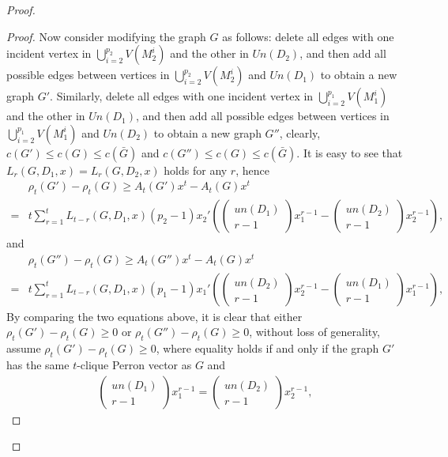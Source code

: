 \documentclass[preprint,12pt]{elsarticle}
\begin{document}
\begin{proof}
\begin{proof}
                Now consider modifying the graph $G$ as follows: delete all edges with one incident vertex in $\bigcup_{i=2}^{p_2} V(M_2^i)$ and the other in $Un(D_2)$, and then add all possible edges between vertices in $\bigcup_{i=2}^{p_2} V(M_2^i)$ and $Un(D_1)$ to obtain a new graph $G'$. Similarly, delete all edges with one incident vertex in $\bigcup_{i=2}^{p_1} V(M_1^i)$ and the other in $Un(D_1)$, and then add all possible edges between vertices in $\bigcup_{i=2}^{p_1} V(M_1^i)$ and $Un(D_2)$ to obtain a new graph $G''$, clearly, $c(G') \leq c(G) \leq c(\bar{G})$ and $c(G'') \leq c(G) \leq c(\bar{G})$. It is easy to see that $L_r(G, D_1, x) = L_r(G, D_2, x)$ holds for any $r$, hence
                    \begin{align*}
                        &\rho_t(G')-\rho_t(G)
                        \geq  A_t(G')x^t-A_t(G)x^t
                        \\= & t\sum_{r=1}^{t}L_{t-r}(G, D_1, x) (p_2-1)x_2' \left( \begin{pmatrix}un(D_1)\\r-1\end{pmatrix}x_1^{r-1}-\begin{pmatrix}un(D_2)\\r-1\end{pmatrix}x_2^{r-1} \right),
                    \end{align*}
                and
                    \begin{align*}
                        &\rho_t(G'')-\rho_t(G)
                        \geq  A_t(G'')x^t-A_t(G)x^t
                        \\= & t\sum_{r=1}^{t}L_{t-r}(G, D_1, x) (p_1-1)x_1' \left( \begin{pmatrix}un(D_2)\\r-1\end{pmatrix}x_2^{r-1}-\begin{pmatrix}un(D_1)\\r-1\end{pmatrix}x_1^{r-1} \right),
                    \end{align*}
                By comparing the two equations above, it is clear that either $\rho_t(G')-\rho_t(G)\geq 0$ or $\rho_t(G'')-\rho_t(G)\geq 0$, without loss of generality, assume $\rho_t(G')-\rho_t(G)\geq 0$, where equality holds if and only if the graph $G'$ has the same $t$-clique Perron vector as $G$ and
                    \begin{align*}
                        \begin{pmatrix}un(D_1)\\r-1\end{pmatrix}x_1^{r-1}= \begin{pmatrix}un(D_2)\\r-1\end{pmatrix}x_2^{r-1},

\end{align*}
\end{proof}
\end{proof}
\end{document}
